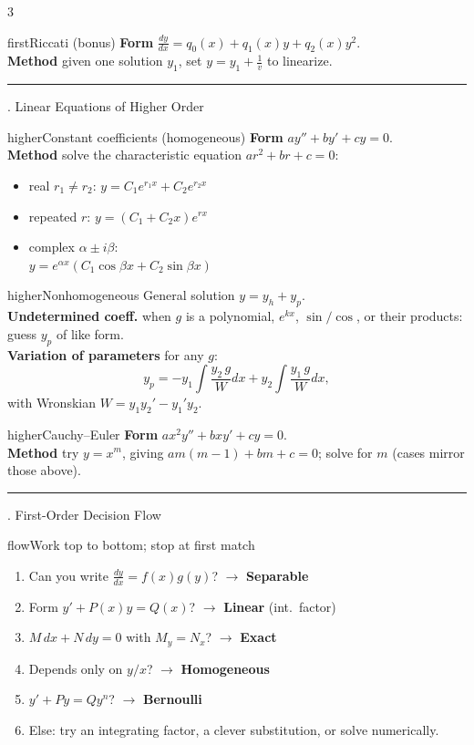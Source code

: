 \documentclass[10pt]{article}
\newcommand{\lab}[1]{\textcolor{ink}{\sffamily\footnotesize\textbf{#1}}\;}
\newcommand{\dydx}{\frac{dy}{dx}}
\newcommand{\sect}[2]{%
  \begin{tcolorbox}[blanker, breakable, before skip=2pt, after skip=2pt]
  \begingroup\sffamily\bfseries\normalsize\color{#1}%
  {\color{#1}\rule[-1pt]{3pt}{12pt}}\;#2\endgroup
  \par\vspace{1pt}{\color{#1}\hrule height 1pt}
  \end{tcolorbox}}
\begin{document}
\begin{multicols}{3}
\begin{card}{first}{Riccati \small(bonus)}
\lab{Form} $\dydx=q_0(x)+q_1(x)y+q_2(x)y^2$.\\
\lab{Method} given one solution $y_1$, set $y=y_1+\frac1v$ to linearize.
\end{card}

\columnbreak
\sect{higher}{3.\; Linear Equations of Higher Order}

\begin{card}{higher}{Constant coefficients (homogeneous)}
\lab{Form} $ay''+by'+cy=0$.\\
\lab{Method} solve the characteristic equation $ar^2+br+c=0$:
\begin{itemize}
\item real $r_1\neq r_2$:\; $y=C_1e^{r_1x}+C_2e^{r_2x}$
\item repeated $r$:\; $y=(C_1+C_2x)e^{rx}$
\item complex $\alpha\pm i\beta$:\\ $y=e^{\alpha x}(C_1\cos\beta x+C_2\sin\beta x)$
\end{itemize}
\end{card}

\begin{card}{higher}{Nonhomogeneous}
General solution $y=y_h+y_p$.\\[2pt]
\lab{Undetermined coeff.} when $g$ is a polynomial, $e^{kx}$, $\sin/\cos$, or their products: guess $y_p$ of like form.\\[2pt]
\lab{Variation of parameters} for any $g$:
\[
y_p=-y_1\!\int\!\frac{y_2\,g}{W}dx+y_2\!\int\!\frac{y_1\,g}{W}dx,
\]
with Wronskian $W=y_1y_2'-y_1'y_2$.
\end{card}

\begin{card}{higher}{Cauchy--Euler}
\lab{Form} $ax^2y''+bxy'+cy=0$.\\
\lab{Method} try $y=x^{m}$, giving $am(m-1)+bm+c=0$; solve for $m$ (cases mirror those above).
\end{card}

\sect{flow}{4.\; First-Order Decision Flow}

\begin{card}{flow}{Work top to bottom; stop at first match}
\begin{enumerate}[leftmargin=1.4em]
\item Can you write $\dydx=f(x)g(y)$? $\to$ \textbf{Separable}
\item Form $y'+P(x)y=Q(x)$? $\to$ \textbf{Linear} (int.\ factor)
\item $M\,dx+N\,dy=0$ with $M_y=N_x$? $\to$ \textbf{Exact}
\item Depends only on $y/x$? $\to$ \textbf{Homogeneous}
\item $y'+Py=Qy^{n}$? $\to$ \textbf{Bernoulli}
\item Else: try an integrating factor, a clever substitution, or solve numerically.
\end{enumerate}
\end{card}


\end{multicols}
\end{document}
